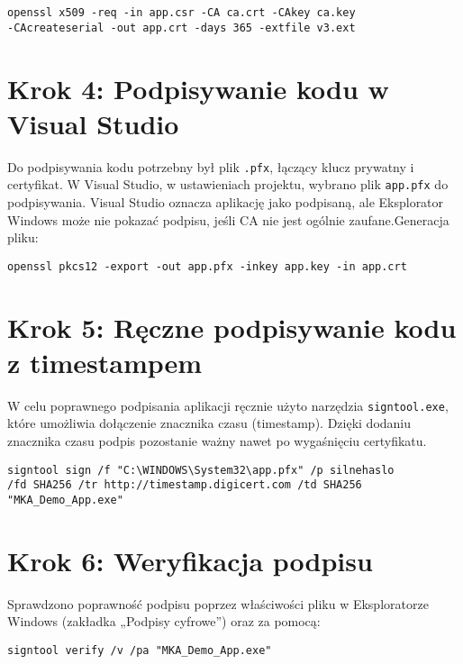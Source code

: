 \documentclass{article}
\begin{document}
\begin{verbatim}
openssl x509 -req -in app.csr -CA ca.crt -CAkey ca.key 
-CAcreateserial -out app.crt -days 365 -extfile v3.ext
\end{verbatim}


\section*{Krok 4: Podpisywanie kodu w Visual Studio}

Do podpisywania kodu potrzebny był plik \texttt{.pfx}, łączący klucz prywatny i certyfikat. W Visual Studio, w ustawieniach projektu, wybrano plik \texttt{app.pfx} do podpisywania. Visual Studio oznacza aplikację jako podpisaną, ale Eksplorator Windows może nie pokazać podpisu, jeśli CA nie jest ogólnie zaufane.Generacja pliku:

\begin{verbatim}
openssl pkcs12 -export -out app.pfx -inkey app.key -in app.crt
\end{verbatim}

\section*{Krok 5: Ręczne podpisywanie kodu z timestampem}

W celu poprawnego podpisania aplikacji ręcznie użyto narzędzia \texttt{signtool.exe}, które umożliwia dołączenie znacznika czasu (timestamp). Dzięki dodaniu znacznika czasu podpis pozostanie ważny nawet po wygaśnięciu certyfikatu.

\begin{verbatim}
signtool sign /f "C:\WINDOWS\System32\app.pfx" /p silnehaslo
/fd SHA256 /tr http://timestamp.digicert.com /td SHA256
"MKA_Demo_App.exe"
\end{verbatim}

\section*{Krok 6: Weryfikacja podpisu}

Sprawdzono poprawność podpisu poprzez właściwości pliku w Eksploratorze Windows (zakładka „Podpisy cyfrowe”) oraz za pomocą:

\begin{verbatim}
signtool verify /v /pa "MKA_Demo_App.exe"
\end{verbatim}
\end{document}
